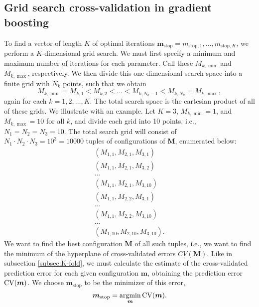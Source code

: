 \subsection{Grid search cross-validation in gradient boosting}\label{grid-search}
To find a vector of length $K$ of optimal iterations $\boldsymbol{m}_{\text{stop}}=m_{\text{stop},1},\ldots,m_{\text{stop},K}$, we perform a $K$-dimensional grid search.
We must first specify a minimum and maximum number of iterations for each parameter.
Call these $M_{k,\min}$ and $M_{k,\max}$, respectively.
We then divide this one-dimensional search space into a finite grid with $N_k$ points, such that we obtain
\begin{equation*} 
    M_{k,\min}=M_{k,1}<M_{k,2}<\ldots<M_{k,N_k-1}<M_{k,N_k}=M_{k,\max},
\end{equation*}
again for each $k=1,2,\ldots,K$.
The total search space is the cartesian product of all of these grids.
We illustrate with an example. Let $K=3$, $M_{k,\min}=1$, and $M_{k,\max}=10$ for all $k$, and divide each grid into 10 points, i.e., $N_1=N_2=N_3=10$.
The total search grid will consist of $N_1\cdot N_2\cdot N_3=10^3=10000$ tuples of configurations of $\boldsymbol{M}$, enumerated below:
\begin{align*}
    \left(M_{1,1},M_{2,1},M_{3,1}\right) \\
    \left(M_{1,1},M_{2,1},M_{3,2}\right) \\
    \ldots \\
    \left(M_{1,1},M_{2,1},M_{3,10}\right) \\
    \left(M_{1,1},M_{2,2},M_{3,1}\right) \\
    \ldots \\
    \left(M_{1,1},M_{2,2},M_{3,10}\right) \\
    \ldots \\
    \left(M_{1,10},M_{2,10},M_{3,10}\right).
\end{align*}
We want to find the best configuration $\boldsymbol{M}$ of all such tuples, i.e., we want to find the minimum of the hyperplane of cross-validated errors $CV(\boldsymbol{M})$.
Like in subsection \ref{subsec:K-fold}, we must calculate the estimate of the cross-validated prediction error for each given configuration $\boldsymbol{m}$, obtaining the prediction error $\operatorname{CV}(\boldsymbol{m})$.
We choose $\boldsymbol{m}_{\text{stop}}$ to be the minimizer of this error,
\begin{equation*}
    \boldsymbol{m}_{\text{stop}}=\operatorname*{argmin}_{\boldsymbol{m}}\operatorname{CV}(\boldsymbol{m}).
\end{equation*}

